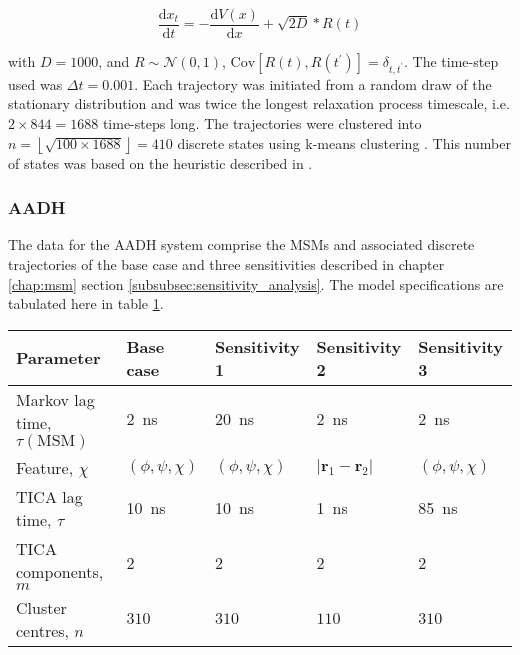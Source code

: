 \begin{equation}
    \frac{\mathrm{d}x_t}{\mathrm{d}t} = -\frac{\mathrm{d}V(x)}{\mathrm{d}x} + \sqrt{2D} * R(t)
\end{equation}

with $D = 1000$, and $R\sim \mathcal{N}(0, 1)$, $\mathrm{Cov}\left[R(t), R(t^{\prime})\right]=\delta_{t, t^{\prime}}$. The time-step used was $\Delta t = 0.001$.  Each trajectory was initiated from a random draw of the stationary distribution and was twice the longest relaxation process timescale, i.e. $2\times 844=1688$ time-steps long. The trajectories were clustered into $n = \left\lfloor\sqrt{100\times 1688}\right\rfloor =410$ discrete states using k-means clustering \cite{friedman2001elements}. This number of states was based on the heuristic described in \cite{husicWardClusteringImproves2017a}. 

\subsubsection{AADH}
The data for the AADH system comprise the MSMs and associated discrete trajectories of the base case and three sensitivities described in chapter \ref{chap:msm} section \ref{subsubsec:sensitivity_analysis}. The model specifications are tabulated here in table \ref{tab:aadh_final_msm_specs}. 

\begin{table}
    \centering
    \begin{tabular}{|l|l|l|l|l|}
        \hline
        Parameter & Base case & Sensitivity 1 & Sensitivity 2 & Sensitivity 3 \\
        \hline\hline
        Markov lag time, $\tau(\textrm{MSM})$ & \SI{2}{\nano\second} &  \SI{20}{\nano\second}& \SI{2}{\nano\second}& \SI{2}{\nano\second} \\
        Feature, $\chi$ & $(\phi, \psi, \chi)$ & $(\phi, \psi, \chi)$ & $|\mathbf{r}_{1}-\mathbf{r}_2|$ & $(\phi, \psi, \chi)$ \\
        TICA lag time, $\tau$ & \SI{10}{\nano\second} & \SI{10}{\nano\second}&\SI{1}{\nano\second} &\SI{85}{\nano\second} \\
        TICA components, $m$ & $2$ & $2$ & $2$ & $2$ \\
        Cluster centres, $n$ & $310$ & $310$ & $110$ & $310$ \\
        \hline
    \end{tabular}
    \label{tab:aadh_final_msm_specs}
\end{table}

